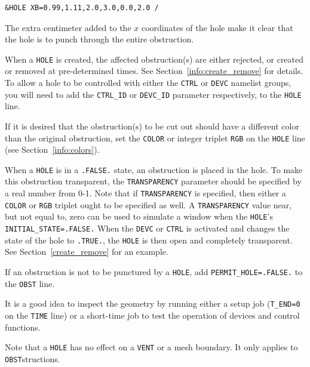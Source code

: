 \documentclass[11pt]{book}
\newcommand{\ct}{\tt\small}
\begin{document}
\footnotesize
\begin{verbatim}
&HOLE XB=0.99,1.11,2.0,3.0,0.0,2.0 /
\end{verbatim}
\normalsize
The extra centimeter added to the $x$ coordinates of the hole make it clear
that the hole is to punch through the entire obstruction.

When a {\ct HOLE} is created, the affected obstruction(s) are either rejected, or
created or removed at pre-determined times. See Section~\ref{info:create_remove} for details.
To allow a hole to be controlled with either the {\ct CTRL} or {\ct DEVC} namelist groups, you will need to add the {\ct CTRL\_ID} or {\ct DEVC\_ID}
parameter respectively, to the {\ct HOLE} line. 

If it is desired that the obstruction(s) to be cut out should have a different color
than the original obstruction, set the {\ct COLOR}  or integer triplet
{\ct RGB}  on the {\ct HOLE} line (see Section~\ref{info:colors}).

When a {\ct HOLE} is in a {\ct .FALSE.} state, an obstruction is placed in the hole.
To make this obstruction transparent, the {\ct TRANSPARENCY} parameter should be specified by
a real number from 0-1. Note that if {\ct TRANSPARENCY} is specified, then either a {\ct COLOR} or {\ct RGB} triplet ought to be specified as well.
A {\ct TRANSPARENCY} value near, but not equal to, zero can be used to simulate a window when the {\ct HOLE}'s {\ct INITIAL\_STATE=.FALSE.} When the {\ct DEVC} or {\ct CTRL}
is activated and changes the state of the hole to {\ct .TRUE.}, the {\ct HOLE} is then open and completely transparent.
See Section~\ref{create_remove} for an example.

If an obstruction is not to be punctured by a {\ct HOLE}, add
{\ct PERMIT\_HOLE=.FALSE.} to the {\ct OBST} line.

\begin{warning}
\noindent
It is a good idea to inspect the geometry by running either a setup job
({\ct T\_END=0} on the {\ct TIME} line) or a short-time job to test the operation of devices and control functions.
\end{warning}

\begin{warning}
\noindent
Note that a {\ct HOLE} has no effect on a {\ct VENT} or a mesh boundary. It only applies to {\ct OBST}structions.
\end{warning}
\end{document}

